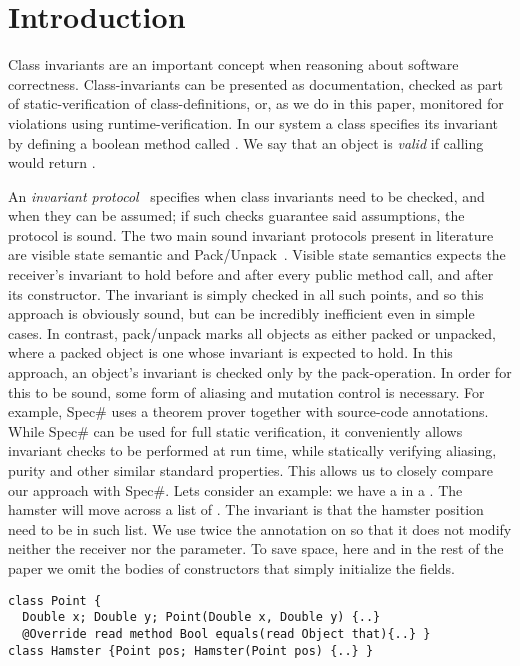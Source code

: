 \section{Introduction}

Class invariants are an important concept when reasoning about software correctness.
Class-invariants can be presented as documentation, checked as part of static-verification of class-definitions, or, as we do in this paper, monitored for violations using runtime-verification.
In our system a class specifies its invariant by defining a boolean method called \Q@invariant@. We say that an object is \emph{valid} if calling \Q@invariant@ would return \Q@true@.

An \emph{invariant protocol}~\cite{?} specifies when class invariants need to be checked, and when they can be assumed; if such checks guarantee said assumptions, the protocol is sound.
The two main sound invariant protocols present in literature are visible state semantic \cite{??} and Pack/Unpack~\cite{?}. Visible state semantics expects the receiver's invariant to hold before and after every public method call, and after its constructor. The invariant is simply checked in all such points, and so this approach is obviously sound, but can be incredibly inefficient even in simple cases.
In contrast, pack/unpack marks all objects as either packed or unpacked, where a packed object is one whose invariant is expected to hold.
In this approach, an object's invariant is checked only by the pack-operation.
In order for this to be sound, some form of aliasing and mutation control is necessary. For example, Spec\# uses a theorem prover together with source-code annotations.
While Spec\# can be used for full static verification, it conveniently allows invariant checks to be performed
at run time, while statically verifying aliasing, purity and other similar standard properties.
This allows us to closely compare our approach with Spec\#.
Lets consider an example: we have a \Q@Hamster@ in a \Q@Cage@.
The hamster will move across a list of \Q@Point@s.
The invariant is that the hamster position need to be in such list.
We use twice the annotation \Q@read@ on \Q@equals@ so that it does not modify neither the
receiver nor the parameter.
To save space, here and in the rest of the paper we omit the bodies of constructors that simply initialize the fields.
\begin{lstlisting}
class Point {
  Double x; Double y; Point(Double x, Double y) {..}
  @Override read method Bool equals(read Object that){..} }
class Hamster {Point pos; Hamster(Point pos) {..} }
\end{lstlisting}
